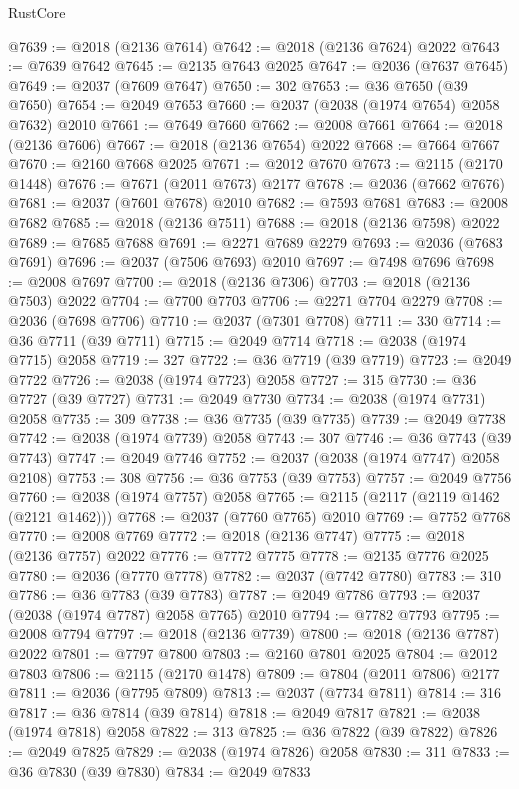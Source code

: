 \begin{lexlean}{RustCore}
\begin{coremodule}
@7639 := @2018 (@2136 @7614)
@7642 := @2018 (@2136 @7624) @2022
@7643 := @7639 @7642
@7645 := @2135 @7643 @2025
@7647 := @2036 (@7637 @7645)
@7649 := @2037 (@7609 @7647)
@7650 := 302
@7653 := @36 @7650 (@39 @7650)
@7654 := @2049 @7653
@7660 := @2037 (@2038 (@1974 @7654) @2058 @7632) @2010
@7661 := @7649 @7660
@7662 := @2008 @7661
@7664 := @2018 (@2136 @7606)
@7667 := @2018 (@2136 @7654) @2022
@7668 := @7664 @7667
@7670 := @2160 @7668 @2025
@7671 := @2012 @7670
@7673 := @2115 (@2170 @1448)
@7676 := @7671 (@2011 @7673) @2177
@7678 := @2036 (@7662 @7676)
@7681 := @2037 (@7601 @7678) @2010
@7682 := @7593 @7681
@7683 := @2008 @7682
@7685 := @2018 (@2136 @7511)
@7688 := @2018 (@2136 @7598) @2022
@7689 := @7685 @7688
@7691 := @2271 @7689 @2279
@7693 := @2036 (@7683 @7691)
@7696 := @2037 (@7506 @7693) @2010
@7697 := @7498 @7696
@7698 := @2008 @7697
@7700 := @2018 (@2136 @7306)
@7703 := @2018 (@2136 @7503) @2022
@7704 := @7700 @7703
@7706 := @2271 @7704 @2279
@7708 := @2036 (@7698 @7706)
@7710 := @2037 (@7301 @7708)
@7711 := 330
@7714 := @36 @7711 (@39 @7711)
@7715 := @2049 @7714
@7718 := @2038 (@1974 @7715) @2058
@7719 := 327
@7722 := @36 @7719 (@39 @7719)
@7723 := @2049 @7722
@7726 := @2038 (@1974 @7723) @2058
@7727 := 315
@7730 := @36 @7727 (@39 @7727)
@7731 := @2049 @7730
@7734 := @2038 (@1974 @7731) @2058
@7735 := 309
@7738 := @36 @7735 (@39 @7735)
@7739 := @2049 @7738
@7742 := @2038 (@1974 @7739) @2058
@7743 := 307
@7746 := @36 @7743 (@39 @7743)
@7747 := @2049 @7746
@7752 := @2037 (@2038 (@1974 @7747) @2058 @2108)
@7753 := 308
@7756 := @36 @7753 (@39 @7753)
@7757 := @2049 @7756
@7760 := @2038 (@1974 @7757) @2058
@7765 := @2115 (@2117 (@2119 @1462 (@2121 @1462)))
@7768 := @2037 (@7760 @7765) @2010
@7769 := @7752 @7768
@7770 := @2008 @7769
@7772 := @2018 (@2136 @7747)
@7775 := @2018 (@2136 @7757) @2022
@7776 := @7772 @7775
@7778 := @2135 @7776 @2025
@7780 := @2036 (@7770 @7778)
@7782 := @2037 (@7742 @7780)
@7783 := 310
@7786 := @36 @7783 (@39 @7783)
@7787 := @2049 @7786
@7793 := @2037 (@2038 (@1974 @7787) @2058 @7765) @2010
@7794 := @7782 @7793
@7795 := @2008 @7794
@7797 := @2018 (@2136 @7739)
@7800 := @2018 (@2136 @7787) @2022
@7801 := @7797 @7800
@7803 := @2160 @7801 @2025
@7804 := @2012 @7803
@7806 := @2115 (@2170 @1478)
@7809 := @7804 (@2011 @7806) @2177
@7811 := @2036 (@7795 @7809)
@7813 := @2037 (@7734 @7811)
@7814 := 316
@7817 := @36 @7814 (@39 @7814)
@7818 := @2049 @7817
@7821 := @2038 (@1974 @7818) @2058
@7822 := 313
@7825 := @36 @7822 (@39 @7822)
@7826 := @2049 @7825
@7829 := @2038 (@1974 @7826) @2058
@7830 := 311
@7833 := @36 @7830 (@39 @7830)
@7834 := @2049 @7833

\end{coremodule}
\end{lexlean}
